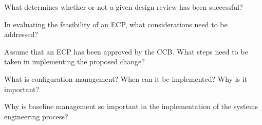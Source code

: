 \begin{exercises}
    \begin{exercise}
    \label{sea-5-18}
        What determines whether or not a given design review has been successful?
    \end{exercise}
    \begin{solution}
    \end{solution}
    
    \begin{exercise}
    \label{sea-5-19}
        In evaluating the feasibility of an ECP, what considerations need to be addressed?
    \end{exercise}
    \begin{solution}
    \end{solution}
    
    \begin{exercise}
    \label{sea-5-20}
        Assume that an ECP has been approved by the CCB. What steps need to be taken in implementing the proposed change?
    \end{exercise}
    \begin{solution}
    \end{solution}
    
    \begin{exercise}
    \label{sea-5-21}
        What is configuration management? When can it be implemented? Why is it important?
    \end{exercise}
    \begin{solution}
    \end{solution}
    
    \begin{exercise}
    \label{sea-5-22}
        Why is baseline management so important in the implementation of the systems engineering process?
    \end{exercise}
    \begin{solution}
    \end{solution}
\end{exercises}

